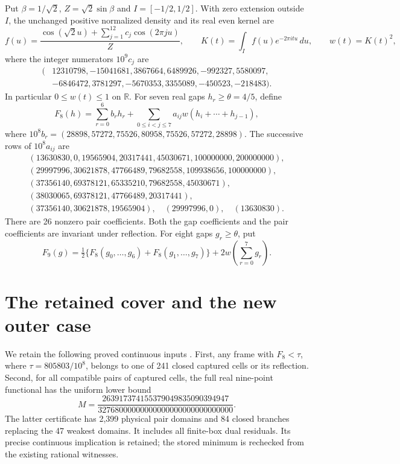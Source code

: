 \documentclass[11pt,a4paper]{article}
\newcommand{\R}{\mathbb R}
\begin{document}
Put $\beta=1/\sqrt2$, $Z=\sqrt2\sin\beta$ and $I=[-1/2,1/2]$.
With zero extension outside $I$, the unchanged positive normalized
density and its real even kernel are
\[
 f(u)=\frac{\cos(\sqrt2u)+\sum_{j=1}^{12}c_j\cos(2\pi ju)}{Z},
 \qquad K(t)=\int_I f(u)e^{-2\pi itu}\,du,\qquad w(t)=K(t)^2,
\]
where the integer numerators $10^9c_j$ are
\[
\begin{split}
(&12310798,-15041681,3867664,6489926,-992327,5580097,\\
 &-6846472,3781297,-5670353,3355089,-450523,-218483).
\end{split}
\]
In particular $0\le w(t)\le1$ on $\R$.
For seven real gaps $h_r\ge\theta=4/5$, define
\[
 F_8(h)=\sum_{r=0}^6b_rh_r+
 \sum_{0\le i<j\le7}a_{ij}w(h_i+\cdots+h_{j-1}),
\]
where $10^8b_r=(28898,57272,75526,80958,75526,57272,28898)$.
The successive rows of $10^8a_{ij}$ are
\[
\begin{array}{l}
(13630830,0,19565904,20317441,45030671,100000000,200000000),\\
(29997996,30621878,47766489,79682558,109938656,100000000),\\
(37356140,69378121,65335210,79682558,45030671),\\
(38030065,69378121,47766489,20317441),\\
(37356140,30621878,19565904),\quad(29997996,0),\quad(13630830).
\end{array}
\]
There are 26 nonzero pair coefficients. Both the gap coefficients
and the pair coefficients are invariant under reflection.
For eight gaps $g_r\ge\theta$, put
\[
 F_9(g)=\tfrac12\{F_8(g_0,\ldots,g_6)+F_8(g_1,\ldots,g_7)\}
          +2w\!\left(\sum_{r=0}^7g_r\right).
\]

\section{The retained cover and the new outer case}

We retain the following proved continuous inputs \cite{PC8,Ninth,Formal}.
First, any frame with $F_8<\tau$, where $\tau=805803/10^8$,
belongs to one of 241 closed captured cells or its reflection.
Second, for all compatible pairs of captured cells, the full real
nine-point functional has the uniform lower bound
\[
 M=\frac{263917374155379049835090394947}
         {32768000000000000000000000000000}.
\]
The latter certificate has 2,399 physical pair domains and 84 closed
branches replacing the 47 weakest domains. It includes all finite-box
dual residuals. Its precise continuous implication is retained;
the stored minimum is rechecked from the existing rational witnesses.
\end{document}
